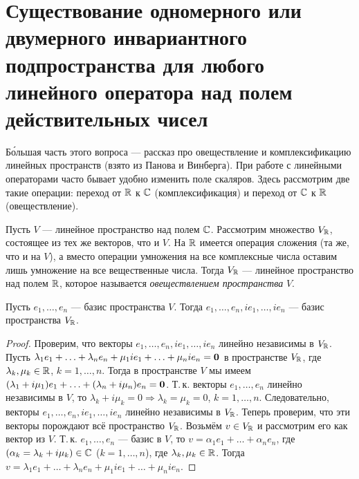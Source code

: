 \section{Существование одномерного или двумерного инвариантного подпространства для любого линейного оператора над полем действительных чисел}

Б\'{о}льшая часть этого вопроса --- рассказ про овеществление и комплексификацию линейных пространств (взято из Панова и Винберга). При работе с линейными операторами часто бывает удобно изменить поле скаляров. Здесь рассмотрим две такие операции: переход от $\mathbb{R}$ к $\mathbb{C}$ (комплексификация) и переход от $\mathbb{C}$ к $\mathbb{R}$ (овеществление).

\begin{definition}
    Пусть $V$ --- линейное пространство над полем $\mathbb{C}$. Рассмотрим множество $V_{\mathbb{R}}$, состоящее из тех же векторов, что и $V$. На $\mathbb{R}$ имеется операция сложения (та же, что и на $V$), а вместо операции умножения на все комплексные числа оставим лишь умножение на все вещественные числа. Тогда $V_{\mathbb{R}}$ --- линейное пространство над полем $\mathbb{R}$, которое называется \textit{овеществлением пространства} $V$.
\end{definition}

\begin{proposal}
    Пусть $e_1, \ldots, e_n$ --- базис пространства $V$. Тогда $e_1, \ldots, e_n, ie_1, \ldots, ie_n$ --- базис пространства $V_{\mathbb{R}}$.
\end{proposal}

\begin{proof}
    Проверим, что векторы $e_1, \ldots, e_n, ie_1, \ldots, ie_n$ линейно независимы в $V_{\mathbb{R}}$. Пусть $\lambda_1e_1 + \ldots + \lambda_ne_n + \mu_1ie_1 + \ldots + \mu_nie_n = \boldsymbol{0}$ в пространстве $V_{\mathbb{R}}$, где $\lambda_k, \mu_k \in \mathbb{R}$, $k = 1, \ldots, n$. Тогда в пространстве $V$ мы имеем $(\lambda_1 + i\mu_1)e_1 + \ldots + (\lambda_n + i\mu_n)e_n = \boldsymbol{0}$. Т.\,к. векторы $e_1, \ldots, e_n$ линейно независимы в $V$, то $\lambda_k + i\mu_k = 0 \Rightarrow \lambda_k = \mu_k = 0$, $k = 1, \ldots, n$. Следовательно, векторы $e_1, \ldots, e_n, ie_1, \ldots, ie_n$ линейно независимы в $V_{\mathbb{R}}$. Теперь проверим, что эти векторы порождают всё пространство $V_{\mathbb{R}}$. Возьмём $v \in V_{\mathbb{R}}$ и рассмотрим его как вектор из $V$. Т.\,к. $e_1, \ldots, e_n$ --- базис в $V$, то $v = \alpha_1e_1 + \ldots + \alpha_ne_n$, где $(\alpha_k = \lambda_k + i\mu_k) \in \mathbb{C}$ ($k = 1, \ldots, n$), где $\lambda_k, \mu_k \in \mathbb{R}$. Тогда $v = \lambda_1e_1 + \ldots + \lambda_ne_n + \mu_1ie_1 + \ldots + \mu_nie_n$.
\end{proof}

